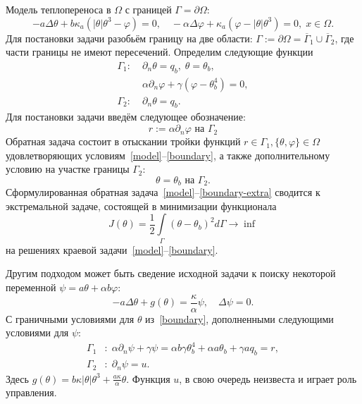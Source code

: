 Модель теплопереноса в $\Omega$ с границей $\Gamma = \partial \Omega$:
\begin{equation}
    \label{model}
    - a \Delta\theta + b\kappa_a(|\theta|\theta^3- \varphi)=0,   \quad
    - \alpha \Delta \varphi + \kappa_a(\varphi-|\theta|\theta^3)=0,\; x\in\Omega.
\end{equation}
Для постановки задачи разобьём границу на две области:
$\Gamma := \partial \Omega =\overline{\Gamma}_1 \cup \overline{\Gamma}_2$,
где части границы не имеют пересечений.
Определим следующие функции
\begin{equation}
    \label{boundary}
    \begin{aligned}
        \Gamma_1 :\; &\partial_n \theta = q_b,\; \theta = \theta_b, \\
        &\alpha\partial_n\varphi + \gamma (\varphi - \theta_b ^4 ) = 0, \\
        \Gamma_2 :\; & \partial_n \theta = q_b.
    \end{aligned}
\end{equation}
Для постановки задачи введём следующее обозначение:
\[
    r:= \alpha \partial_n \varphi \text{ на }\Gamma_2
\]
Обратная задача состоит в отыскании тройки функций $r \in  \Gamma_1, \{\theta, \varphi\} \in \Omega $
удовлетворяющих условиям~\eqref{model}--\eqref{boundary}, а также дополнительному условию
на участке границы $\Gamma_2$:
\begin{equation}
    \label{boundary-extra}
    \theta = \theta_b \text{ на } \Gamma_2.
\end{equation}
Сформулированная обратная задача~\eqref{model}--\eqref{boundary-extra} сводится к экстремальной задаче,
состоящей в минимизации функционала
\begin{equation}
    \label{cost}
    J(\theta) = \frac{1}{2}\int\limits_\Gamma (\theta - \theta_b)^{2} d\Gamma \rightarrow \inf
\end{equation}
на решениях краевой задачи~\eqref{model}--\eqref{boundary}.


Другим подходом может быть сведение исходной задачи к поиску некоторой
переменной $\psi = a\theta + \alpha b \varphi$:
\begin{equation}
    \label{eq:equation}
    -a \Delta \theta + g (\theta) = \frac{\kappa}{\alpha}\psi, \quad
    \Delta \psi = 0.
\end{equation}
С граничными условиями для $\theta$ из~\eqref{boundary}, дополненными следующими условиями для
$\psi$:
\begin{equation}
    \label{eq:boundary-2}
    \begin{aligned}
        \Gamma_1 &: \; \alpha \partial_n \psi + \gamma \psi = \alpha b \gamma \theta_b^4 + \alpha a \theta_b + \gamma a q_b = r, \\
        \Gamma_2 &: \; \partial_n \psi = u.
    \end{aligned}
\end{equation}
Здесь $g(\theta) = b \kappa|\theta|\theta^3 + \frac{a\kappa}{\alpha}\theta$.
Функция $u$, в свою очередь неизвеста и играет роль управления.